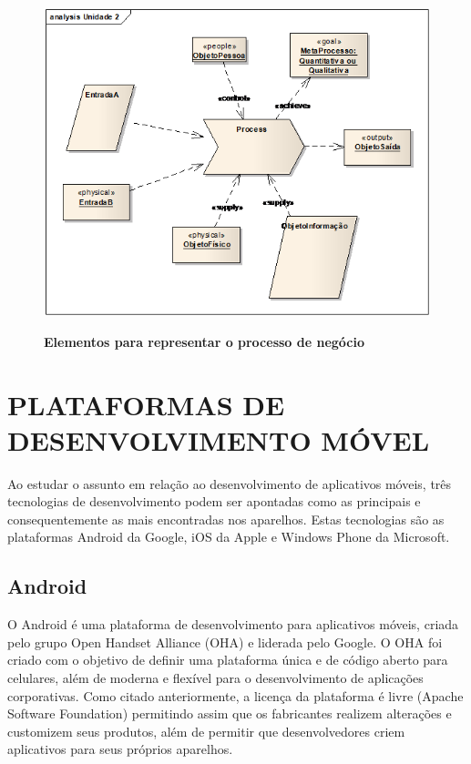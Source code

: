 \documentclass[
	12pt,				%
	openright,			%
	oneside,			%
	a4paper,			%
	chapter=TITLE,		%
	section=TITLE,		%
	english,			%
	french,				%
	spanish,			%
	brazil				%
	]{abntex2}
\begin{document}
\begin{figure}[htb]
	\begin{center}
		\caption{
			\textbf{Elementos para representar o processo de negócio}
		}\label{fig-macroprocesso}
		\includegraphics [scale=0.6]{imagens/macroprocesso.png}
		\label{fig-macroprocesso}
	\end{center}
\end{figure}


\section{PLATAFORMAS DE DESENVOLVIMENTO MÓVEL}
Ao estudar o assunto em relação ao desenvolvimento de aplicativos móveis, três tecnologias de desenvolvimento podem ser apontadas como as principais e consequentemente as mais encontradas nos aparelhos. Estas tecnologias são as plataformas Android da Google, iOS da Apple e Windows Phone da Microsoft.

\subsection{Android}
O Android é uma plataforma de desenvolvimento para aplicativos móveis, criada pelo grupo Open Handset Alliance (OHA) e liderada pelo Google. O OHA foi criado com o objetivo de definir uma plataforma única e de código aberto para celulares, além de moderna e flexível para o desenvolvimento de aplicações corporativas. Como citado anteriormente, a licença da plataforma é livre (Apache Software Foundation) permitindo assim que os fabricantes realizem alterações e customizem seus produtos, além de permitir que desenvolvedores criem aplicativos para seus próprios aparelhos. 
\end{document}

